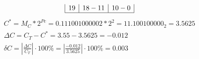 \documentclass{article}
\begin{document}
\begin{enumerate}
\begin{enumerate}
$$\begin{array}{|c|c|c|}
                                        19 & 18-11    & 10-0 \\\hline
                                 \end{array}
                          $$$$
                                 \begin{array}{c}
                                        C^*      = M_C * 2^{Pc} = 0.11100100000{2} * 2^{2} = 11.100100000_{2}  = 3.5625                              \\
                                        \Delta C = C_T - C^* = 3.55 - 3.5625 = -0.012                                                                  \\
                                        \delta C = \left|\frac{\Delta C}{C_T}\right| \cdot 100\% = \left|\frac{-0.012}{3.5625 }\right| \cdot 100\% = 0.003 \\
                                 \end{array}
                          $$
             \end{enumerate}
\end{enumerate}


\end{document}
